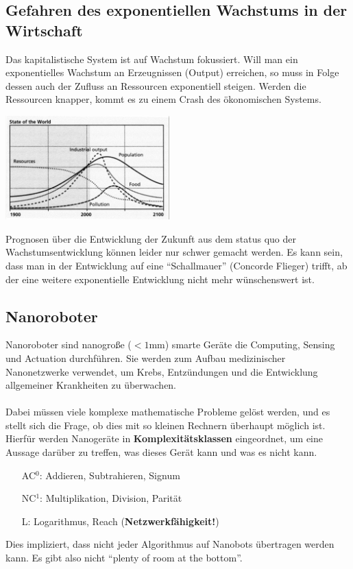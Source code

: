 \documentclass[a4paper]{article}
\begin{document}
\subsection{Gefahren des exponentiellen Wachstums in der Wirtschaft}
Das kapitalistische System ist auf Wachstum fokussiert. Will man ein exponentielles Wachstum an Erzeugnissen (Output) erreichen, so muss in Folge dessen auch der Zufluss an Ressourcen exponentiell steigen. Werden die Ressourcen knapper, kommt es zu einem Crash des ökonomischen Systems. 
\begin{center}
	\includegraphics[height = 4cm]{growth.png}
\end{center}
 Prognosen über die Entwicklung der Zukunft aus dem status quo der Wachstumsentwicklung können leider nur schwer gemacht werden. Es kann sein, dass man in der Entwicklung auf eine ``Schallmauer'' (Concorde Flieger) trifft, ab der eine weitere exponentielle Entwicklung nicht mehr wünschenswert ist.
 \subsection{Nanoroboter}
 Nanoroboter sind nanogroße ($<1$mm) smarte Geräte die Computing, Sensing und Actuation durchführen. Sie werden zum Aufbau medizinischer Nanonetzwerke verwendet, um Krebs, Entzündungen und die Entwicklung allgemeiner Krankheiten zu überwachen.\\
 \\
 
 Dabei müssen viele komplexe mathematische Probleme gelöst werden, und es stellt sich die Frage, ob dies mit so kleinen Rechnern überhaupt möglich ist. Hierfür werden Nanogeräte in \textbf{Komplexitätsklassen} eingeordnet, um eine Aussage darüber zu treffen, was dieses Gerät kann und was es nicht kann.
 \begin{itemize}
 	\item[\textsc{AC}$^0$:] Addieren, Subtrahieren, Signum
 	\item[\textsc{NC}$^1$:] Multiplikation, Division, Parität
 	\item[\textsc{L}:] Logarithmus, Reach (\textbf{Netzwerkfähigkeit!})
 \end{itemize}
Dies impliziert, dass nicht jeder Algorithmus auf Nanobots übertragen werden kann. Es gibt also nicht ``plenty of room at the bottom''.
\end{document}
